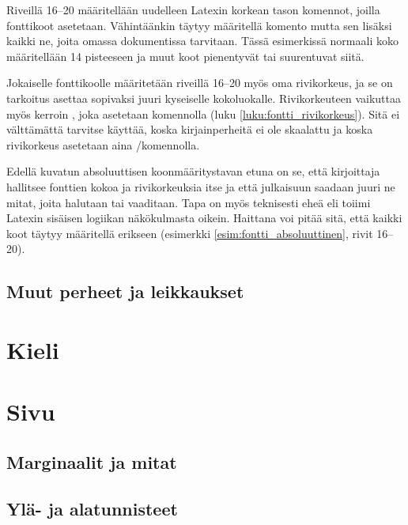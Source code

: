 \begin{koodilohkosis}
  \abssans\fontsize{16pt}{20pt}\bfseries
\end{koodilohkosis}

Riveillä 16--20 määritellään uudelleen Latexin korkean tason komennot,
joilla fonttikoot asetetaan. Vähintäänkin täytyy määritellä komento
 mutta sen lisäksi kaikki ne, joita omassa
dokumentissa tarvitaan. Tässä esimerkissä normaali koko määritellään 14
pisteeseen ja muut koot pienentyvät tai suurentuvat siitä.

Jokaiselle fonttikoolle määritetään riveillä 16--20 myös oma
rivikorkeus, ja se on tarkoitus asettaa sopivaksi juuri kyseiselle
kokoluokalle. Rivikorkeuteen vaikuttaa myös kerroin , joka asetetaan komennolla 
(luku \ref{luku:fontti_rivikorkeus}). Sitä ei välttämättä tarvitse
käyttää, koska kirjainperheitä ei ole skaalattu ja koska rivikorkeus
asetetaan aina \-/komennolla.

Edellä kuvatun absoluuttisen koonmääritystavan etuna on se, että
kirjoittaja hallitsee fonttien kokoa ja rivikorkeuksia itse ja että
julkaisuun saadaan juuri ne mitat, joita halutaan tai vaaditaan. Tapa on
myös teknisesti eheä eli toiimi Latexin sisäisen logiikan näkökulmasta
oikein. Haittana voi pitää sitä, että kaikki koot täytyy määritellä
erikseen (esimerkki \ref{esim:fontti_absoluuttinen}, rivit 16--20).

\subsection{Muut perheet ja leikkaukset}
\section{Kieli}
\label{luku:kieliasetukset}
\section{Sivu}
\label{luku:sivuasetukset}
\subsection{Marginaalit ja mitat}
\subsection{Ylä- ja alatunnisteet}

